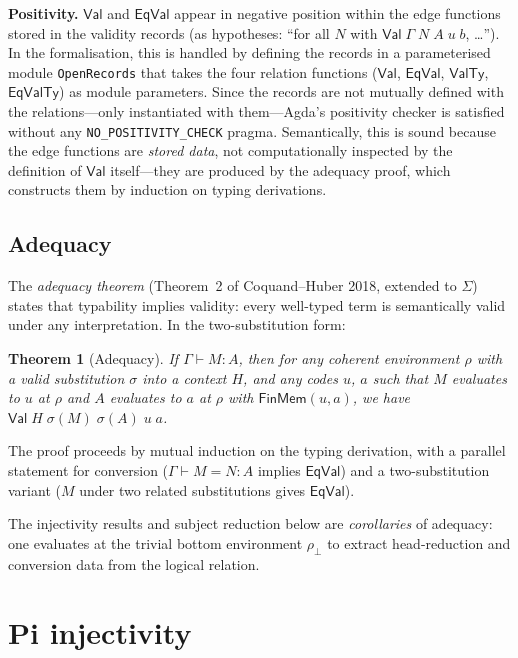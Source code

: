 \documentclass[11pt]{article}
\newcommand{\hastype}[3]{#1 \vdash #2 : #3}
\newcommand{\conveq}[4]{#1 \vdash #2 = #3 : #4}
\newcommand{\Val}{\mathsf{Val}}
\newcommand{\EqVal}{\mathsf{EqVal}}
\newcommand{\ValTy}{\mathsf{ValTy}}
\newcommand{\EqValTy}{\mathsf{EqValTy}}
\newtheorem{theorem}{Theorem}
\begin{document}
\medskip\noindent\textbf{Positivity.}
$\Val$ and $\EqVal$ appear in negative position within the edge
functions stored in the validity records (as hypotheses: ``for all $N$
with $\Val\;\Gamma\;N\;A\;u\;b$, \ldots'').  In the formalisation,
this is handled by defining the records in a parameterised module
\texttt{OpenRecords} that takes the four relation functions ($\Val$,
$\EqVal$, $\ValTy$, $\EqValTy$) as module parameters.  Since the
records are not mutually defined with the relations---only
instantiated with them---Agda's positivity checker is satisfied
without any \texttt{NO\_POSITIVITY\_CHECK} pragma.  Semantically, this
is sound because the edge functions are \emph{stored data}, not
computationally inspected by the definition of $\Val$ itself---they
are produced by the adequacy proof, which constructs them by induction
on typing derivations.

\subsection{Adequacy}

The \emph{adequacy theorem} (Theorem~2 of Coquand--Huber 2018, extended to
$\Sigma$) states that typability implies validity: every well-typed term
is semantically valid under any interpretation.  In the two-substitution form:

\begin{theorem}[Adequacy]
If $\hastype{\Gamma}{M}{A}$, then for any coherent environment $\rho$ with
a valid substitution $\sigma$ into a context $H$, and any codes $u$, $a$ such
that $M$ evaluates to $u$ at $\rho$ and $A$ evaluates to $a$ at $\rho$ with
$\mathsf{FinMem}(u,a)$, we have $\Val\;H\;\sigma(M)\;\sigma(A)\;u\;a$.
\end{theorem}

\noindent
The proof proceeds by mutual induction on the typing derivation, with a
parallel statement for conversion ($\conveq{\Gamma}{M}{N}{A}$ implies
$\EqVal$) and a two-substitution variant ($M$ under two related substitutions
gives $\EqVal$).

\medskip\noindent
The injectivity results and subject reduction below are
\emph{corollaries} of adequacy: one evaluates at the trivial bottom
environment $\rho_\bot$ to extract head-reduction and conversion data from
the logical relation.

\section{Pi injectivity}
\end{document}
